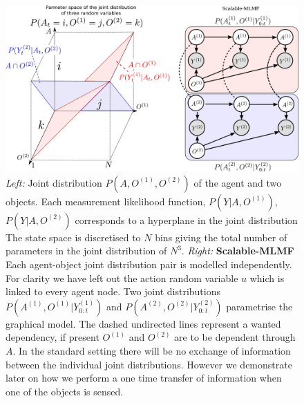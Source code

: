 \begin{figure}
 \centering
  \includegraphics[width=\textwidth]{./ch5-MLMF/Figures/Figure8_v2.pdf}
  \caption{\textit{Left:} Joint distribution $P(A,O^{(1)},O^{(2)})$ of the agent and two objects. Each measurement likelihood function, $P(Y|A,O^{(1)})$, 
  $P(Y|A,O^{(2)})$ corresponds to a hyperplane in the joint distribution
  The state space is discretised to $N$ bins giving the total number of parameters in the joint distribution of $N^3$. 
  \textit{Right:} \textbf{Scalable-MLMF} Each agent-object joint distribution pair is modelled independently. For clarity we have left 
  out the action random variable $u$ which is linked to every agent node.
  Two joint distributions $P(A^{(1)},O^{(1)}|Y^{(1)}_{0:t})$   and $P(A^{(2)},O^{(2)}|Y^{(2)}_{0:t})$ parametrise the graphical model. 
  The dashed undirected lines represent a wanted dependency, if present $O^{(1)}$ and $O^{(2)}$ are to be dependent through $A$. In
  the standard setting there will be no exchange of information between the individual joint distributions. However we demonstrate later on how
  we perform a one time transfer of information when one of the objects is sensed.}
  \label{fig:3bel_lik_profile}
\end{figure}

